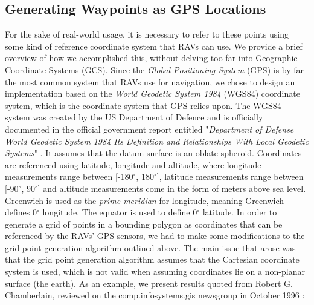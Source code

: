 





\subsection{Generating Waypoints as GPS Locations}
For the sake of real-world usage, it is necessary to refer to these points using some kind of reference coordinate system that RAVs can use. We provide a brief overview of how we accomplished this, without delving too far into Geographic Coordinate Systems (GCS). Since the \textit{Global Positioning System} (GPS) is by far the most common system that RAVs use for navigation, we chose to design an implementation based on the \textit{World Geodetic System 1984} (WGS84) coordinate system, which is the coordinate system that GPS relies upon. The WGS84 system was created by the US Department of Defence and is officially documented in the official government report entitled "\textit{Department of Defense World Geodetic System 1984 Its Definition and Relationships With Local Geodetic Systems}" \cite{ReportpreparedbytheDMAWGS84DevelopmentCommittee1991Department1984}. It assumes that the datum surface is an oblate spheroid.
Coordinates are referenced using latitude, longitude and altitude, where longitude measurements range between [-180$^{\circ}$, 180$^{\circ}$], latitude measurements range between [-90$^{\circ}$, 90$^{\circ}$] and altitude measurements come in the form of meters above sea level. Greenwich is used as the \textit{prime meridian} for longitude, meaning Greenwich defines 0$^{\circ}$ longitude. The equator is used to define 0$^{\circ}$ latitude. In order to generate a grid of points in a bounding polygon as coordinates that can be referenced by the RAVs' GPS sensors, we had to make some modifications to the grid point generation algorithm outlined above. The main issue that arose was that the grid point generation algorithm assumes that the Cartesian coordinate system is used, which is not valid when assuming coordinates lie on a non-planar surface (the earth). As an example, we present results quoted from Robert G. Chamberlain, reviewed on the comp.infosystems.gis newsgroup in October 1996 \cite{GISL_LISTSERVER}:

